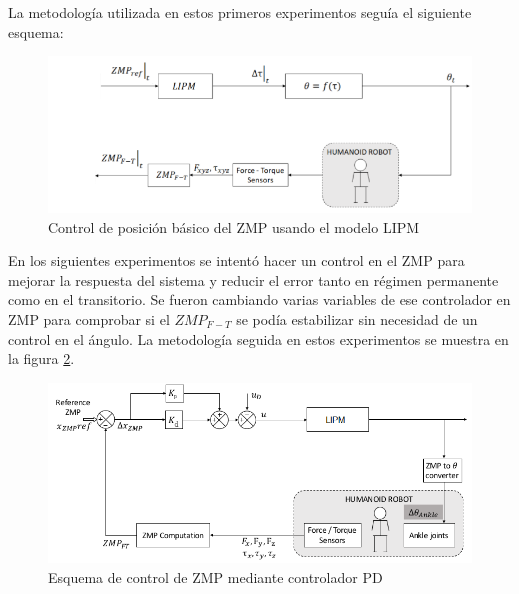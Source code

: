 La metodología utilizada en estos primeros experimentos seguía el siguiente esquema:

\begin{figure}[H]
\centering
\includegraphics[scale=2.2]{imagenes/apartado_5/5.1/51_esquema1}
\caption{Control de posición básico del ZMP usando el modelo LIPM}
\label{figura51}
\end{figure}






En los siguientes experimentos se intentó hacer un control en el ZMP para mejorar la respuesta del sistema y reducir el error tanto en régimen permanente como en el transitorio. Se fueron cambiando varias variables de ese controlador en ZMP para comprobar si el $ZMP_{F-T}$ se podía estabilizar sin necesidad de un control en el ángulo. La metodología seguida en estos experimentos se muestra en la figura \ref{figura551}.

\begin{figure}[H]
\centering
\includegraphics[scale=0.6]{imagenes/apartado_5/5.1/55_esquema_bucle_cerrado}
\caption{Esquema de control de ZMP mediante controlador PD}
\label{figura551}
\end{figure}


